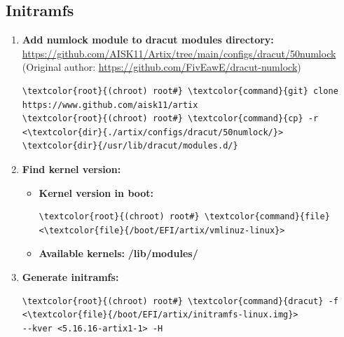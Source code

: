 \documentclass[10pt, a4paper, onecolumn, oneside, titlepage, openany]{book}
\begin{document}
\subsection{Initramfs}
\begin{enumerate}
    \item \textbf{Add numlock module to dracut modules directory:}
\newline \url{https://github.com/AISK11/Artix/tree/main/configs/dracut/50numlock}
\newline (Original author: \url{https://github.com/FivEawE/dracut-numlock})
\begin{Verbatim}[commandchars=\\\{\}]
\textcolor{root}{(chroot) root#} \textcolor{command}{git} clone https://www.github.com/aisk11/artix
\textcolor{root}{(chroot) root#} \textcolor{command}{cp} -r <\textcolor{dir}{./artix/configs/dracut/50numlock/}>
\textcolor{dir}{/usr/lib/dracut/modules.d/}
\end{Verbatim}
    \item \textbf{Find kernel version:}
    \begin{itemize}
        \item \textbf{Kernel version in boot:}
\begin{Verbatim}[commandchars=\\\{\}]
\textcolor{root}{(chroot) root#} \textcolor{command}{file} <\textcolor{file}{/boot/EFI/artix/vmlinuz-linux}>
\end{Verbatim}
        \item \textbf{Available kernels:}
\newline \textbf{\textcolor{dir}{/lib/modules/}}
    \end{itemize}
    \item \textbf{Generate initramfs:}
\begin{Verbatim}[commandchars=\\\{\}]
\textcolor{root}{(chroot) root#} \textcolor{command}{dracut} -f <\textcolor{file}{/boot/EFI/artix/initramfs-linux.img}>
--kver <5.16.16-artix1-1> -H
\end{Verbatim}
\end{enumerate}
\end{document}
